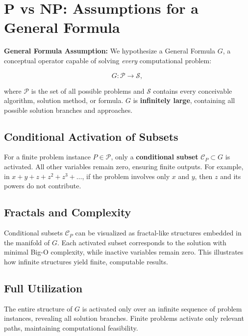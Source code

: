 \documentclass[12pt]{article}
\begin{document}
\newpage

\tableofcontents
\thispagestyle{empty}

\newpage

\section{P vs NP: Assumptions for a General Formula}

\noindent \textbf{General Formula Assumption:} We hypothesize a General Formula $G$, a conceptual operator capable of solving \textit{every} computational problem:

\[
G: \mathcal{P} \to \mathcal{S},
\]

where $\mathcal{P}$ is the set of all possible problems and $\mathcal{S}$ contains every conceivable algorithm, solution method, or formula. $G$ is \textbf{infinitely large}, containing all possible solution branches and approaches.

\subsection{Conditional Activation of Subsets}

For a finite problem instance $P \in \mathcal{P}$, only a \textbf{conditional subset} $\mathcal{C}_P \subset G$ is activated. All other variables remain zero, ensuring finite outputs. For example, in $x + y + z + z^2 + z^3 + \dots$, if the problem involves only $x$ and $y$, then $z$ and its powers do not contribute.

\subsection{Fractals and Complexity}

Conditional subsets $\mathcal{C}_P$ can be visualized as fractal-like structures embedded in the manifold of $G$. Each activated subset corresponds to the solution with minimal Big-O complexity, while inactive variables remain zero. This illustrates how infinite structures yield finite, computable results.

\subsection{Full Utilization}

The entire structure of $G$ is activated only over an infinite sequence of problem instances, revealing all solution branches. Finite problems activate only relevant paths, maintaining computational feasibility.
\end{document}
